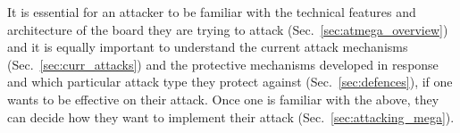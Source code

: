 	It is essential for an attacker to be familiar with the technical features and architecture of the board they are trying to attack (Sec.~\ref{sec:atmega_overview}) and it is equally important to understand the current attack mechanisms (Sec.~\ref{sec:curr_attacks}) and the protective mechanisms developed in response and which particular attack type they protect against (Sec.~\ref{sec:defences}), if one wants to be effective on their attack. Once one is familiar with the above, they can decide how they want to implement their attack (Sec.~\ref{sec:attacking_mega}).